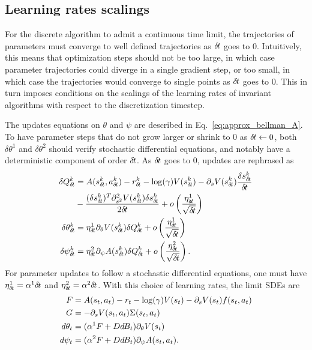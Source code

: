 \subsection{Learning rates scalings}
\label{subsec:lr}
For the discrete algorithm to admit a continuous time limit, the trajectories
of parameters must converge to well defined trajectories as ${\delta\hspace{-.1em}t}$ goes to
$0$.  Intuitively, this means that optimization steps should not be too large,
in which case parameter trajectories could diverge in a single gradient step,
or too small, in which case the trajectories would converge to single points as
${\delta\hspace{-.1em}t}$ goes to $0$.  This in turn imposes conditions on the scalings of the
learning rates of invariant algorithms with respect to the discretization
timestep.

The updates equations on $\theta$ and $\psi$ are described in
Eq.~\eqref{eq:approx_bellman_A}.  To have parameter steps that do not grow
larger or shrink to $0$ as ${\delta\hspace{-.1em}t} \leftarrow 0$, both $\delta \theta^1$ and
$\delta \theta^2$ should verify stochastic differential equations, and notably
have a deterministic component of order ${\delta\hspace{-.1em}t}$. As ${\delta\hspace{-.1em}t}$ goes to $0$,
updates are rephrased as
\begin{align}
	\delta Q^k_\deltat &= A(s^k_\deltat, a^k_\deltat) - r^k_\deltat - \log(\gamma) V(s^k_\deltat) - \partial_s V(s^k_\deltat) \frac{\delta s^k_\deltat}{\deltat}\nonumber \\&- \frac{(\delta s^k_\deltat)^T \partial_{s^2}^2 V(s^k_\deltat) \delta s^k_\deltat}{2\deltat} + \smallo\left(\frac{\eta^1_\deltat}{\sqrt{\deltat}}\right)\\
	\delta \theta^k_\deltat &= \eta^1_\deltat \partial_{\theta} V(s^k_\deltat) \delta Q^k_\deltat + \smallo\left(\frac{\eta^1_\deltat}{\sqrt{\deltat}}\right)\\
	\delta \psi^k_\deltat &= \eta^2_\deltat \partial_{\psi} A(s^k_\deltat) \delta Q^k_\deltat + \smallo\left(\frac{\eta^2_\deltat}{\sqrt{\deltat}}\right).
\end{align}
For parameter updates to follow a stochastic differential equations, one must
have $\eta^1_{\delta\hspace{-.1em}t} = \alpha^1 {\delta\hspace{-.1em}t}$ and $\eta^2_{\delta\hspace{-.1em}t} = \alpha^2
{\delta\hspace{-.1em}t}$. With this choice of learning rates, the limit SDEs are
\begin{align}
	F &= A(s_t, a_t) - r_t - \log(\gamma) V(s_t) - \partial_s V(s_t) f(s_t, a_t)\nonumber\\
	G &= - \partial_s V(s_t, a_t) \Sigma(s_t, a_t)\nonumber\\
	d\theta_t &= (\alpha^1 F  + D d\hspace{-.1em}B_t)\partial_{\theta} V(s_t)\nonumber\\
	d\psi_t &= (\alpha^2 F  + D d\hspace{-.1em}B_t)\partial_{\psi} A(s_t, a_t)\nonumber.
\end{align}

